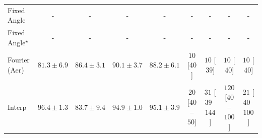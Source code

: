 \begin{tabular}{l|cccc|cccc|}
Fixed Angle & {\cellcolor[HTML]{000000}} \color[HTML]{F1F1F1} {\cellcolor{white}} \color{black} - & {\cellcolor[HTML]{000000}} \color[HTML]{F1F1F1} {\cellcolor{white}} \color{black} - & {\cellcolor[HTML]{000000}} \color[HTML]{F1F1F1} {\cellcolor{white}} \color{black} - & {\cellcolor[HTML]{000000}} \color[HTML]{F1F1F1} {\cellcolor{white}} \color{black} - & {\cellcolor[HTML]{000000}} \color[HTML]{F1F1F1} {\cellcolor{white}} \color{black} - & {\cellcolor[HTML]{000000}} \color[HTML]{F1F1F1} {\cellcolor{white}} \color{black} - & {\cellcolor[HTML]{000000}} \color[HTML]{F1F1F1} {\cellcolor{white}} \color{black} - & {\cellcolor[HTML]{000000}} \color[HTML]{F1F1F1} {\cellcolor{white}} \color{black} - \\
Fixed Angle$^\star$ & {\cellcolor[HTML]{000000}} \color[HTML]{F1F1F1} {\cellcolor{white}} \color{black} - & {\cellcolor[HTML]{000000}} \color[HTML]{F1F1F1} {\cellcolor{white}} \color{black} - & {\cellcolor[HTML]{000000}} \color[HTML]{F1F1F1} {\cellcolor{white}} \color{black} - & {\cellcolor[HTML]{000000}} \color[HTML]{F1F1F1} {\cellcolor{white}} \color{black} - & {\cellcolor[HTML]{000000}} \color[HTML]{F1F1F1} {\cellcolor{white}} \color{black} - & {\cellcolor[HTML]{000000}} \color[HTML]{F1F1F1} {\cellcolor{white}} \color{black} - & {\cellcolor[HTML]{000000}} \color[HTML]{F1F1F1} {\cellcolor{white}} \color{black} - & {\cellcolor[HTML]{000000}} \color[HTML]{F1F1F1} {\cellcolor{white}} \color{black} - \\
Fourier (Aer) & {\cellcolor[HTML]{FFEEA8}} \color[HTML]{000000} $81.3\pm 6.9$ & {\cellcolor[HTML]{FEAD3A}} \color[HTML]{000000} $86.4\pm 3.1$ & {\cellcolor[HTML]{EB6F14}} \color[HTML]{F1F1F1} $90.1\pm 3.7$ & {\cellcolor[HTML]{F98E23}} \color[HTML]{F1F1F1} $88.2\pm 6.1$ & {\cellcolor[HTML]{FFF7F3}} \color[HTML]{000000} $10$ [$40$] & {\cellcolor[HTML]{FFF7F3}} \color[HTML]{000000} $10$ [$39$] & {\cellcolor[HTML]{FFF7F3}} \color[HTML]{000000} $10$ [$40$] & {\cellcolor[HTML]{FFF7F3}} \color[HTML]{000000} $10$ [$40$] \\
Interp & {\cellcolor[HTML]{7C2C05}} \color[HTML]{F1F1F1} $96.4\pm 1.3$ & {\cellcolor[HTML]{FED573}} \color[HTML]{000000} $83.7\pm 9.4$ & {\cellcolor[HTML]{9B3504}} \color[HTML]{F1F1F1} $94.9\pm 1.0$ & {\cellcolor[HTML]{963304}} \color[HTML]{F1F1F1} $95.1\pm 3.9$ & {\cellcolor[HTML]{FFF5F1}} \color[HTML]{000000} $20$ [$40$--$50$] & {\cellcolor[HTML]{FFF2EE}} \color[HTML]{000000} $31$ [$39$--$144$] & {\cellcolor[HTML]{FDD8D5}} \color[HTML]{000000} $120$ [$40$--$100$] & {\cellcolor[HTML]{FFF4F0}} \color[HTML]{000000} $21$ [$40$--$100$] \\

\end{tabular}
